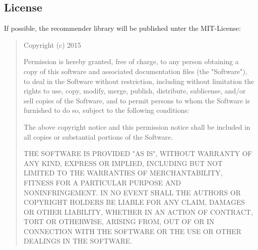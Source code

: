 \subsection{License}
If possible, the recommender library will be published unter the MIT-License:\\

\begin{quote}
Copyright (c) 2015 \myAuthor

Permission is hereby granted, free of charge, to any person obtaining a copy of this software and associated documentation files (the "Software"), to deal in the Software without restriction, including without limitation the rights to use, copy, modify, merge, publish, distribute, sublicense, and/or sell copies of the Software, and to permit persons to whom the Software is furnished to do so, subject to the following conditions:

The above copyright notice and this permission notice shall be included in all copies or substantial portions of the Software.

THE SOFTWARE IS PROVIDED "AS IS", WITHOUT WARRANTY OF ANY KIND, EXPRESS OR IMPLIED, INCLUDING BUT NOT LIMITED TO THE WARRANTIES OF MERCHANTABILITY, FITNESS FOR A PARTICULAR PURPOSE AND NONINFRINGEMENT. IN NO EVENT SHALL THE AUTHORS OR COPYRIGHT HOLDERS BE LIABLE FOR ANY CLAIM, DAMAGES OR OTHER LIABILITY, WHETHER IN AN ACTION OF CONTRACT, TORT OR OTHERWISE, ARISING FROM, OUT OF OR IN CONNECTION WITH THE SOFTWARE OR THE USE OR OTHER DEALINGS IN THE SOFTWARE.
\end{quote}










